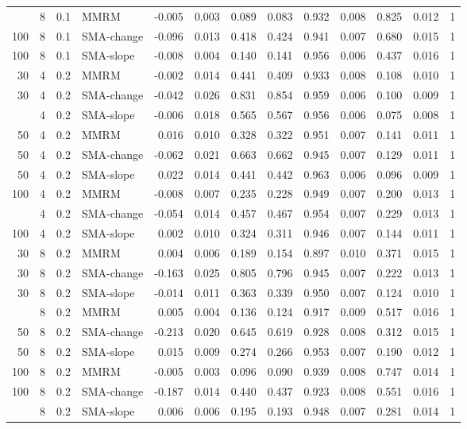 \documentclass[
  11pt,
]{article}
\begin{document}
\begin{table}[!h]
{\begin{tabular}[t]{rrrlrrrrrrrrr}
\addlinespace
100 & 8 & 0.1 & MMRM & -0.005 & 0.003 & 0.089 & 0.083 & 0.932 & 0.008 & 0.825 & 0.012 & 1\\
100 & 8 & 0.1 & SMA-change & -0.096 & 0.013 & 0.418 & 0.424 & 0.941 & 0.007 & 0.680 & 0.015 & 1\\
100 & 8 & 0.1 & SMA-slope & -0.008 & 0.004 & 0.140 & 0.141 & 0.956 & 0.006 & 0.437 & 0.016 & 1\\
30 & 4 & 0.2 & MMRM & -0.002 & 0.014 & 0.441 & 0.409 & 0.933 & 0.008 & 0.108 & 0.010 & 1\\
30 & 4 & 0.2 & SMA-change & -0.042 & 0.026 & 0.831 & 0.854 & 0.959 & 0.006 & 0.100 & 0.009 & 1\\
\addlinespace
30 & 4 & 0.2 & SMA-slope & -0.006 & 0.018 & 0.565 & 0.567 & 0.956 & 0.006 & 0.075 & 0.008 & 1\\
50 & 4 & 0.2 & MMRM & 0.016 & 0.010 & 0.328 & 0.322 & 0.951 & 0.007 & 0.141 & 0.011 & 1\\
50 & 4 & 0.2 & SMA-change & -0.062 & 0.021 & 0.663 & 0.662 & 0.945 & 0.007 & 0.129 & 0.011 & 1\\
50 & 4 & 0.2 & SMA-slope & 0.022 & 0.014 & 0.441 & 0.442 & 0.963 & 0.006 & 0.096 & 0.009 & 1\\
100 & 4 & 0.2 & MMRM & -0.008 & 0.007 & 0.235 & 0.228 & 0.949 & 0.007 & 0.200 & 0.013 & 1\\
\addlinespace
100 & 4 & 0.2 & SMA-change & -0.054 & 0.014 & 0.457 & 0.467 & 0.954 & 0.007 & 0.229 & 0.013 & 1\\
100 & 4 & 0.2 & SMA-slope & 0.002 & 0.010 & 0.324 & 0.311 & 0.946 & 0.007 & 0.144 & 0.011 & 1\\
30 & 8 & 0.2 & MMRM & 0.004 & 0.006 & 0.189 & 0.154 & 0.897 & 0.010 & 0.371 & 0.015 & 1\\
30 & 8 & 0.2 & SMA-change & -0.163 & 0.025 & 0.805 & 0.796 & 0.945 & 0.007 & 0.222 & 0.013 & 1\\
30 & 8 & 0.2 & SMA-slope & -0.014 & 0.011 & 0.363 & 0.339 & 0.950 & 0.007 & 0.124 & 0.010 & 1\\
\addlinespace
50 & 8 & 0.2 & MMRM & 0.005 & 0.004 & 0.136 & 0.124 & 0.917 & 0.009 & 0.517 & 0.016 & 1\\
50 & 8 & 0.2 & SMA-change & -0.213 & 0.020 & 0.645 & 0.619 & 0.928 & 0.008 & 0.312 & 0.015 & 1\\
50 & 8 & 0.2 & SMA-slope & 0.015 & 0.009 & 0.274 & 0.266 & 0.953 & 0.007 & 0.190 & 0.012 & 1\\
100 & 8 & 0.2 & MMRM & -0.005 & 0.003 & 0.096 & 0.090 & 0.939 & 0.008 & 0.747 & 0.014 & 1\\
100 & 8 & 0.2 & SMA-change & -0.187 & 0.014 & 0.440 & 0.437 & 0.923 & 0.008 & 0.551 & 0.016 & 1\\
\addlinespace
100 & 8 & 0.2 & SMA-slope & 0.006 & 0.006 & 0.195 & 0.193 & 0.948 & 0.007 & 0.281 & 0.014 & 1\\
\bottomrule
\end{tabular}}
\end{table}
\end{document}
